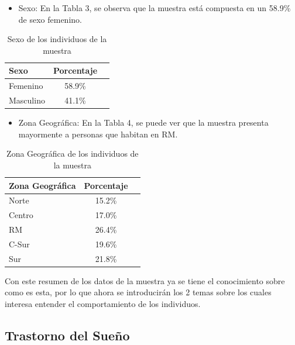 \documentclass[
  10pt,
  letterpaper,
  DIV=11,
  numbers=noendperiod,
  twocolumn]{scrartcl}
\providecommand{\tightlist}{%
  \setlength{\itemsep}{0pt}\setlength{\parskip}{0pt}}\usepackage{longtable,booktabs,array}
\begin{document}
\begin{itemize}
\tightlist
\item
  Sexo: En la Tabla 3, se observa que la muestra está compuesta en un
  58.9\% de sexo femenino.
\end{itemize}

\begin{table}[H]
  \centering
  \begin{tabular}{lcc}
    \toprule
    Sexo & Porcentaje \\
    \midrule
    Femenino    & 58.9\%  \\
    Masculino   & 41.1\%  \\
    \bottomrule
  \end{tabular}
  \caption{Sexo de los individuos de la muestra}
  
\end{table}

\begin{itemize}
\tightlist
\item
  Zona Geográfica: En la Tabla 4, se puede ver que la muestra presenta
  mayormente a personas que habitan en RM.
\end{itemize}

\begin{table}[H]
  \centering
  \begin{tabular}{lcc}
    \toprule
    Zona Geográfica & Porcentaje \\
    \midrule
    Norte   &    15.2\% \\
    Centro  &    17.0\% \\
    RM      &    26.4\% \\
    C-Sur   &    19.6\% \\
    Sur     &    21.8\% \\
    \bottomrule
  \end{tabular}
  \caption{Zona Geográfica de los individuos de la muestra}
  
\end{table}

Con este resumen de los datos de la muestra ya se tiene el conocimiento
sobre como es esta, por lo que ahora se introducirán los 2 temas sobre
los cuales interesa entender el comportamiento de los individuos.

\hypertarget{trastorno-del-sueuxf1o}{%
\subsection{Trastorno del Sueño}\label{trastorno-del-sueuxf1o}}
\end{document}
